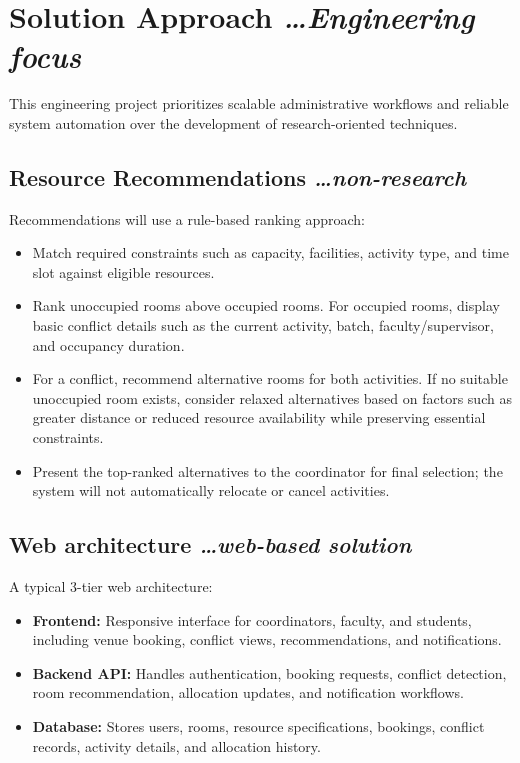\documentclass[11pt,a4paper]{article}
\newcommand{\BvrHint}[1]{%
  {\normalfont\normalsize\itshape\hfill #1}}
\begin{document}
\section{Solution Approach %
\BvrHint{\ldots Engineering focus}}
This engineering project prioritizes scalable administrative workflows and reliable system automation over the development of research-oriented techniques.

\subsection{Resource Recommendations %
\BvrHint{\ldots non-research}}
Recommendations will use a rule-based ranking approach:
\begin{itemize}[leftmargin=0.7cm]
    \item Match required constraints such as capacity, facilities, activity type, and time slot against eligible resources.
    \item Rank unoccupied rooms above occupied rooms. For occupied rooms, display basic conflict details such as the current activity, batch, faculty/supervisor, and occupancy duration.
    \item For a conflict, recommend alternative rooms for both activities. If no suitable unoccupied room exists, consider relaxed alternatives based on factors such as greater distance or reduced resource availability while preserving essential constraints.
    \item Present the top-ranked alternatives to the coordinator for final selection; the system will not automatically relocate or cancel activities.
\end{itemize}

\subsection{Web architecture %
\BvrHint{\ldots web-based solution}}
A typical 3-tier web architecture:
\begin{itemize}[leftmargin=0.7cm]
    \item \textbf{Frontend:} Responsive interface for coordinators, faculty, and students, including venue booking, conflict views, recommendations, and notifications.
    \item \textbf{Backend API:} Handles authentication, booking requests, conflict detection, room recommendation, allocation updates, and notification workflows.
    \item \textbf{Database:} Stores users, rooms, resource specifications, bookings, conflict records, activity details, and allocation history.
\end{itemize}
\end{document}
